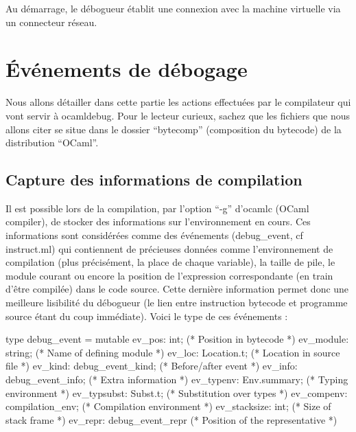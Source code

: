 \documentclass[11pt,a4paper]{report}
\begin{document}
Au démarrage, le débogueur établit une connexion avec la machine virtuelle via un connecteur réseau.



\section{\'Evénements de débogage}

Nous allons détailler dans cette partie les actions effectuées par le compilateur qui vont servir à ocamldebug. Pour le lecteur curieux, sachez que les fichiers que nous allons citer se situe dans le dossier ``bytecomp'' (composition du bytecode) de la distribution ``OCaml''.

\subsection{Capture des informations de compilation}

Il est possible lors de la compilation, par l'option ``-g'' d'ocamlc (OCaml compiler), de stocker des informations sur l'environnement en cours. Ces informations sont considérées comme des événements (debug\_event, cf instruct.ml) qui contiennent de précieuses données comme l'environnement de compilation (plus précisément, la place de chaque variable), la taille de pile, le module courant ou encore la position de l'expression correspondante (en train d'être compilée) dans le code source. Cette dernière information permet donc une meilleure lisibilité du débogueur (le lien entre instruction bytecode et programme source étant du coup immédiate). Voici le type de ces événements :

\begin{OCaml}

type debug_event =
  { mutable ev_pos: int;                (* Position in bytecode *)
    ev_module: string;                  (* Name of defining module *)
    ev_loc: Location.t;                 (* Location in source file *)
    ev_kind: debug_event_kind;          (* Before/after event *)
    ev_info: debug_event_info;          (* Extra information *)
    ev_typenv: Env.summary;             (* Typing environment *)
    ev_typsubst: Subst.t;               (* Substitution over types *)
    ev_compenv: compilation_env;        (* Compilation environment *)
    ev_stacksize: int;                  (* Size of stack frame *)
    ev_repr: debug_event_repr }         (* Position of the representative *)

\end{OCaml}
\end{document}
